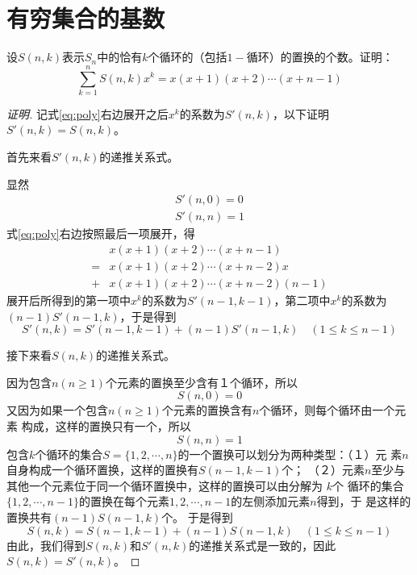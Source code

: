 \chapter{有穷集合的基数}
\begin{Ex}
  设$S(n,k)$表示$S_n$中的恰有$k$个循环的（包括$1-$循环）的置换的个数。证明：
  \begin{equation}
    \label{eq:poly}
    \sum_{k=1}^nS(n,k)x^k = x(x+1)(x+2)\cdots(x+n-1)
  \end{equation}
\end{Ex}
\begin{proof}[证明]
  记式\eqref{eq:poly}右边展开之后$x^k$的系数为$S'(n,k)$，以下证明
  $S'(n,k)=S(n,k)$。

  首先来看$S'(n,k)$的递推关系式。
  
  显然
  \begin{equation}
    \begin{split}
      S'(n,0) = 0\\
      S'(n,n) = 1
    \end{split}
  \end{equation}
  式\eqref{eq:poly}右边按照最后一项展开，得
  \begin{equation}
    \begin{split}
    &x(x+1)(x+2)\cdots(x+n-1)\\
    =&x(x+1)(x+2)\cdots(x+n-2)x\\
    +&x(x+1)(x+2)\cdots(x+n-2)(n-1)
    \end{split}
  \end{equation}
  展开后所得到的第一项中$x^k$的系数为$S'(n-1,k-1)$，第二项中$x^k$的系数为
  $(n-1)S'(n-1,k)$，于是得到
  \begin{equation}
    S'(n,k) = S'(n-1,k-1) + (n-1)S'(n-1,k) \quad (1 \leq k \leq n-1)
  \end{equation}

  接下来看$S(n,k)$的递推关系式。
  
  因为包含$n(n\geq 1)$个元素的置换至少含有１个循环，所以
  \begin{equation}
    S(n,0)=0
  \end{equation}
  又因为如果一个包含$n(n\geq 1)$个元素的置换含有$n$个循环，则每个循环由一个元素
  构成，这样的置换只有一个，所以
  \begin{equation}
    S(n,n)=1
  \end{equation}
  包含$k$个循环的集合$S=\{1,2,\cdots,n\}$的一个置换可以划分为两种类型：（１）元
  素$n$自身构成一个循环置换，这样的置换有$S(n-1,k-1)$个；
  （２）元素$n$至少与其他一个元素位于同一个循环置换中，这样的置换可以由分解为
  $k$个
  循环的集合
  $\{1,2,\cdots, n-1\}$的置换在每个元素$1,2,\cdots,n-1$的左侧添加元素$n$得到，于
  是这样的置换共有$(n-1)S(n-1,k)$个。
  于是得到
\begin{equation}
    S(n,k) = S(n-1,k-1) + (n-1)S(n-1,k) \quad (1 \leq k \leq n-1)
  \end{equation}
由此，我们得到$S(n,k)$和$S'(n,k)$的递推关系式是一致的，因此$S(n,k)=S'(n,k)$。  
\end{proof}
